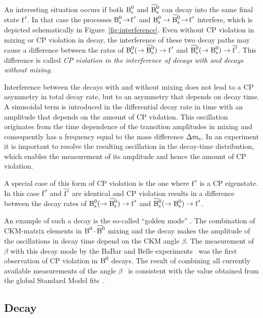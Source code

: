 An interesting situation occurs if both $\Bs$ and $\Bsbar$ can decay into the same final state $\fp$. In that case the processes
$\Bstof[\fp]$ and $\Bs\to\Bsbartof[\fp]$ interfere, which is depicted schematically in Figure~\ref{fig:interference}. Even without CP
violation in mixing or CP violation in decay, the interference of these two decay paths may cause a difference between the rates of
$\Bs(\to\Bsbar)\to\fp$ and $\Bsbar(\to\Bs)\to\overline{\fp}$. This difference is called \emph{CP violation in the interference of decays
with and decays without mixing}.

Interference between the decays with and without mixing does not lead to a CP asymmetry in total decay rate, but to an asymmetry that
depends on decay time. A sinusoidal term is introduced in the differential decay rate in time with an amplitude that depends on the amount
of CP violation. This oscillation originates from the time dependence of the transition amplitudes in \BsBsbar{} mixing and consequently has
a frequency equal to the mass difference $\Dms$. In an experiment it is important to resolve the resulting oscillation in the decay-time
distribution, which enables the measurement of its amplitude and hence the amount of CP violation.

A special case of this form of CP violation is the one where $\fp$ is a CP eigenstate. In this case $\fp$ and $\overline{\fp}$ are
identical and CP violation results in a difference between the decay rates of $\Bs(\to\Bsbar)\to\fp$ and $\Bsbar(\to\Bs)\to\fp$.

An example of such a decay is the so-called ``golden mode'' \BdtoJpsiKS. The combination of CKM-matrix elements in $\Bd$--$\Bdbar$ mixing
and the \BdtoJpsiKS{} decay makes the amplitude of the oscillations in decay time depend on the CKM angle $\beta$. The measurement of
$\beta$ with this decay mode by the BaBar and Belle experiments~\cite{Aubert:2001nu,*Abe:2001xe} was the first observation of CP violation
in $\Bd$ decays. The result of combining all currently available measurements of the angle $\beta$~\cite{Amhis:2012bh} is consistent with
the value obtained from the global Standard Model fits~\cite{Charles:2004jd,Bona:2005vz}.


\subsection{\texorpdfstring{\BstoJpsiphi{}}{Bs0->Jpsiphi} Decay}
\label{subsec:intro_Jpsiphi_decay}

